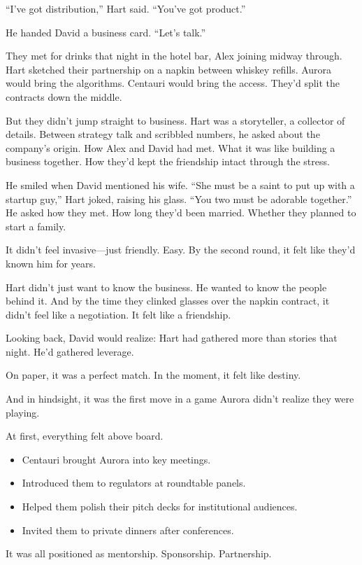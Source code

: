 “I’ve got distribution,” Hart said. “You’ve got product.”

He handed David a business card.  
“Let’s talk.”

They met for drinks that night in the hotel bar, Alex joining midway through. Hart sketched their partnership on a napkin between whiskey refills. Aurora would bring the algorithms. Centauri would bring the access. They’d split the contracts down the middle.

But they didn’t jump straight to business. Hart was a storyteller, a collector of details. Between strategy talk and scribbled numbers, he asked about the company’s origin. How Alex and David had met. What it was like building a business together. How they’d kept the friendship intact through the stress.

He smiled when David mentioned his wife. “She must be a saint to put up with a startup guy,” Hart joked, raising his glass. “You two must be adorable together.” He asked how they met. How long they’d been married. Whether they planned to start a family.

It didn’t feel invasive—just friendly. Easy.  
By the second round, it felt like they’d known him for years.

Hart didn’t just want to know the business.  
He wanted to know the people behind it.  
And by the time they clinked glasses over the napkin contract,  
it didn’t feel like a negotiation.  
It felt like a friendship.

Looking back, David would realize:  
Hart had gathered more than stories that night.  
He’d gathered leverage.


On paper, it was a perfect match.  
In the moment, it felt like destiny.

And in hindsight, it was the first move in a game Aurora didn’t realize they were playing.


At first, everything felt above board.

\begin{itemize}
  \item Centauri brought Aurora into key meetings.  
  \item Introduced them to regulators at roundtable panels.  
  \item Helped them polish their pitch decks for institutional audiences.  
  \item Invited them to private dinners after conferences.
\end{itemize}

It was all positioned as mentorship. Sponsorship. Partnership.

